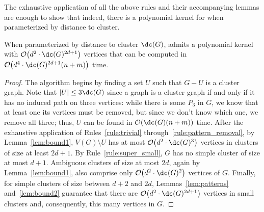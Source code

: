 The exhaustive application of all the above rules and their accompanying lemmas are enough to show that indeed, there is a polynomial kernel for  when parameterized by distance to cluster.


\begin{theorem}
    When parameterized by distance to cluster $\dc(G)$,  admits a polynomial kernel with $\bigO{d^2\cdot\dc(G)^{2d+1}}$ vertices that can be computed in $\bigO{d^4\cdot\dc(G)^{2d+1}(n+m)}$ time.
\end{theorem}

\begin{proof}
    The algorithm begins by finding a set $U$ such that $G - U$ is a cluster graph.
    Note that $|U| \leq 3\dc(G)$ since a graph is a cluster graph if and only if it has no induced path on three vertices: while there is some $P_3$ in $G$, we know that at least one its vertices must be removed, but since we don't know which one, we remove all three; thus, $U$ can be found in $\bigO{\dc(G)(n + m)}$ time.
    After the exhaustive application of Rules~\ref{rule:trivial} through~\ref{rule:pattern_removal}, by Lemma~\ref{lem:bound1}, $V(G) \setminus U$ has at most $\bigO{d^2\cdot\dc(G)^3}$ vertices in clusters of size at least $2d+1$.
    By Rule~\ref{rule:super_small}, $G$ has no simple cluster of size at most $d+1$.
    Ambiguous clusters of size at most $2d$, again by Lemma~\ref{lem:bound1}, also comprise only $\bigO{d^2\cdot\dc(G)^2}$ vertices of $G$.
    Finally, for simple clusters of size between $d+2$ and $2d$, Lemmas~\ref{lem:patterns} and~\ref{lem:bound2} guarantee that there are $\bigO{d^2\cdot\dc(G)^{2d+1}}$ vertices in small clusters and, consequently, this many vertices in $G$.


\end{proof}
